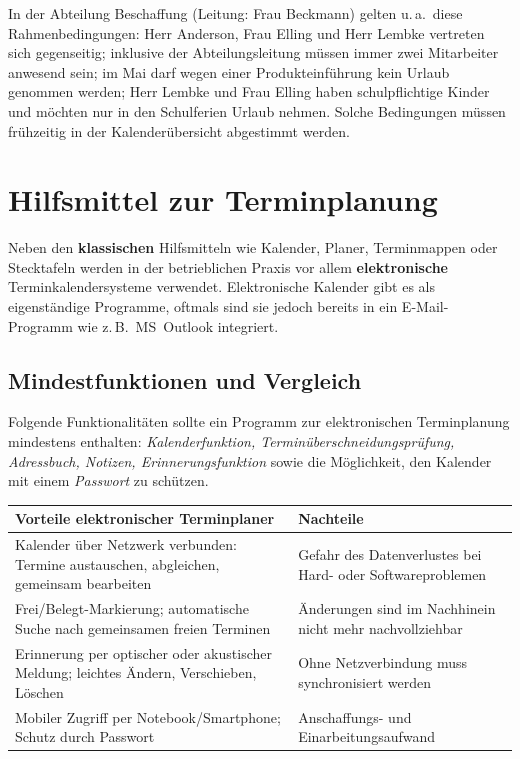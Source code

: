\documentclass[11pt, a4paper]{article}
\begin{document}
\begin{beispiel}
In der Abteilung Beschaffung (Leitung: Frau Beckmann) gelten u.\,a.\ diese
Rahmenbedingungen: Herr Anderson, Frau Elling und Herr Lembke vertreten sich gegenseitig;
inklusive der Abteilungsleitung müssen immer zwei Mitarbeiter anwesend sein; im Mai darf
wegen einer Produkteinführung kein Urlaub genommen werden; Herr Lembke und Frau Elling
haben schulpflichtige Kinder und möchten nur in den Schulferien Urlaub nehmen. Solche
Bedingungen müssen frühzeitig in der Kalenderübersicht abgestimmt werden.
\end{beispiel}

\section{Hilfsmittel zur Terminplanung}

Neben den \textbf{klassischen} Hilfsmitteln wie Kalender, Planer, Terminmappen oder
Stecktafeln werden in der betrieblichen Praxis vor allem \textbf{elektronische}
Terminkalendersysteme verwendet. Elektronische Kalender gibt es als eigenständige
Programme, oftmals sind sie jedoch bereits in ein E-Mail-Programm wie z.\,B.\ MS~Outlook
integriert.

\subsection{Mindestfunktionen und Vergleich}

Folgende Funktionalitäten sollte ein Programm zur elektronischen Terminplanung
mindestens enthalten: \emph{Kalenderfunktion, Terminüberschneidungsprüfung, Adressbuch,
Notizen, Erinnerungsfunktion} sowie die Möglichkeit, den Kalender mit einem
\emph{Passwort} zu schützen.

\begin{tabular}{p{6.2cm} p{6.2cm}}
\toprule
\textbf{Vorteile elektronischer Terminplaner} & \textbf{Nachteile}\\
\midrule
Kalender über Netzwerk verbunden: Termine austauschen, abgleichen, gemeinsam bearbeiten & Gefahr des Datenverlustes bei Hard- oder Softwareproblemen\\
Frei/Belegt-Markierung; automatische Suche nach gemeinsamen freien Terminen & Änderungen sind im Nachhinein nicht mehr nachvollziehbar\\
Erinnerung per optischer oder akustischer Meldung; leichtes Ändern, Verschieben, Löschen & Ohne Netzverbindung muss synchronisiert werden\\
Mobiler Zugriff per Notebook/Smartphone; Schutz durch Passwort & Anschaffungs- und Einarbeitungsaufwand\\
\bottomrule
\end{tabular}
\end{document}
